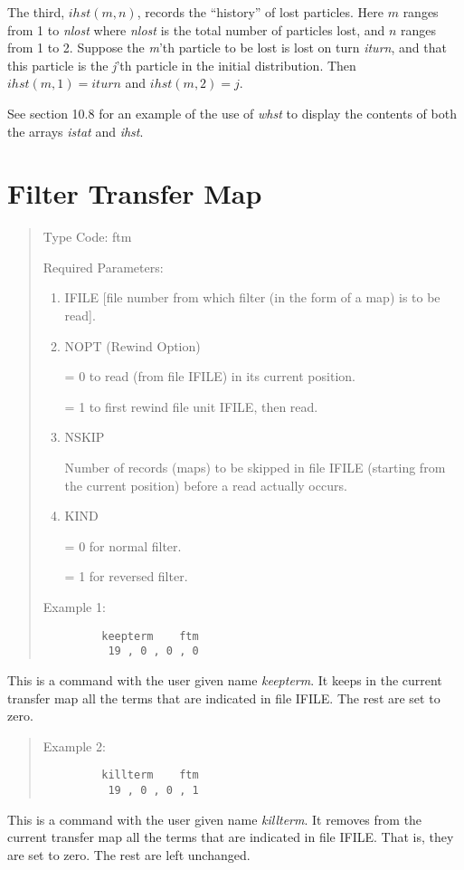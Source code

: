 The third, $ihst(m,n)$, records the ``history'' of lost particles.  Here $m$ ranges from 1 to {\em nlost} where {\em nlost} is the total number of particles lost, and $n$ ranges from 1 to 2.  Suppose the {\em m}'th particle to be lost is lost on turn {\em iturn}, and that this particle is the {\em j}'th particle in the initial distribution.  Then $ihst(m,1) = iturn$ and $ihst(m,2) = j$.

See section 10.8 for an example of the use of {\em whst} to display the contents of both the arrays {\em istat} and {\em ihst}.

\newpage
\section{Filter Transfer Map}
\begin{quotation}
\noindent     Type Code:  ftm
\vspace{5mm}

\noindent     Required Parameters:
\begin{enumerate}
      \item  IFILE [file number from which filter (in the form of a map) is
             to be read].

      \item  NOPT (Rewind Option)

             = 0 to read (from file IFILE) in its current position.

             = 1 to first rewind file unit IFILE, then read.

      \item  NSKIP

             Number of records (maps) to be skipped in file IFILE (starting
             from the current position) before a read actually occurs.

      \item  KIND

             = 0 for normal filter.

             = 1 for reversed filter.
\end{enumerate}

\vspace{5mm}
\noindent     Example 1:
\begin{verbatim}
         keepterm    ftm
          19 , 0 , 0 , 0
\end{verbatim}
\end{quotation}
This is a command with the user given name {\em keepterm}.  It keeps  in the current transfer map all the terms that are indicated in file IFILE.  The rest are set to zero.
\begin{quotation}
\noindent     Example 2:
\begin{verbatim}
         killterm    ftm
          19 , 0 , 0 , 1
\end{verbatim}
\end{quotation}
This is a command with the user given name {\em killterm}.  It removes from the current transfer map all the terms that are indicated in file IFILE.  That is, they are set to zero.  The rest are left unchanged.

